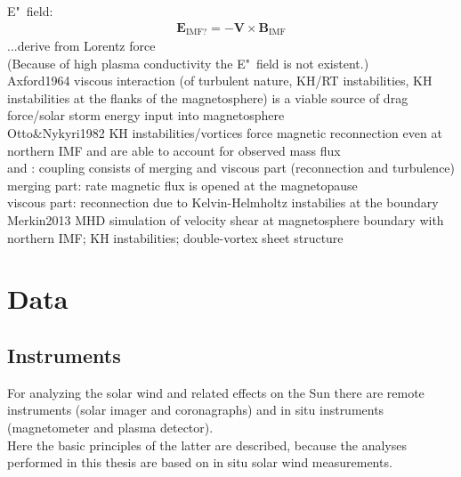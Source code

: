 E"~field:	%
\begin{align}
	\textbf{E}_\text{IMF?} = -\textbf{V} \times \textbf{B}_\text{IMF}
\end{align}
...derive from Lorentz force\\
(Because of high plasma conductivity the E"~field is not existent.)\\

Axford1964 viscous interaction (of turbulent nature, KH/RT instabilities, KH instabilities at the flanks of the magnetosphere) is a viable source of drag force/solar storm energy input into magnetosphere\\

Otto\&Nykyri1982 KH instabilities/vortices force magnetic reconnection even at northern IMF and are able to account for observed mass flux\\

\citet{Newell2007} and \citet{Newell2008}: coupling consists of merging and viscous part (reconnection and turbulence)\\
merging part: rate magnetic flux is opened at the magnetopause\\
viscous part: reconnection due to Kelvin-Helmholtz instabilies at the boundary\\

Merkin2013 MHD simulation of velocity shear at magnetosphere boundary with northern IMF; KH instabilities; double-vortex sheet structure\\


\chapter{Data}
\label{chap:data}



\section{Instruments}

For analyzing the solar wind and related effects on the Sun there are remote instruments (solar imager and coronagraphs) and in situ instruments (magnetometer and plasma detector).\\
Here the basic principles of the latter are described, because the analyses performed in this thesis are based on in situ solar wind measurements.\\

